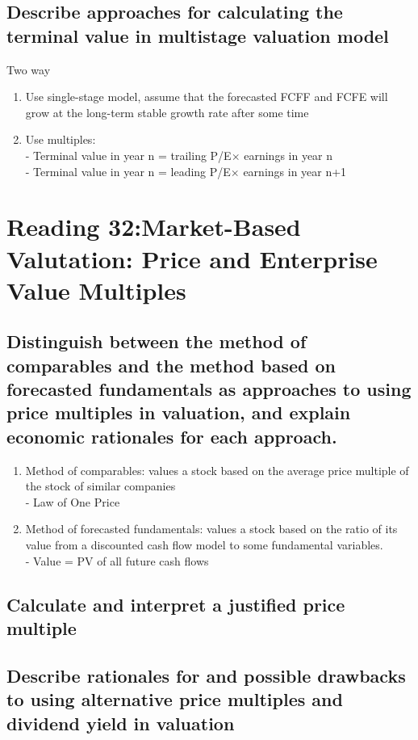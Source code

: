 \documentclass{article}
\newcommand{\be}{\begin{enumerate}}
\newcommand{\ee}{\end{enumerate}}
\begin{document}
\subsection{Describe approaches for calculating the terminal value in multistage valuation model}
Two way
\be
    \item Use single-stage model, assume that the forecasted FCFF and FCFE will grow at
        the long-term stable growth rate after some time
    \item Use multiples: 
        \\- Terminal value in year n = trailing P/E$\times$ earnings in year n
        \\- Terminal value in year n = leading P/E$\times$ earnings in year n+1
\ee


\section{Reading 32:Market-Based Valutation: Price and Enterprise Value Multiples}
\subsection{Distinguish between the method of comparables and the method based on
forecasted fundamentals as approaches to using price multiples in valuation, and
explain economic rationales for each approach.}
\be
    \item Method of comparables: values a stock based on the average price multiple
        of the stock of similar companies
        \\- Law of One Price
    \item Method of forecasted fundamentals: values a stock based on the ratio of
        its value from a discounted cash flow model to some fundamental variables.
        \\- Value = PV of all future cash flows
\ee 
\subsection{Calculate and interpret a justified price multiple}
\subsection{Describe rationales for and possible drawbacks to using alternative price multiples
and dividend yield in valuation}
\end{document}
